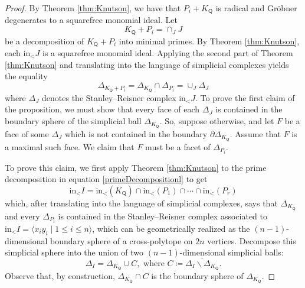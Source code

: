 \documentclass[10pt]{amsart}
\numberwithin{equation}{section}
\theoremstyle{definition}
\theoremstyle{remark}
\newcommand{\1}{^{-1}}
\def\Q{\mathsf{Q}}
\begin{document}
\begin{proof}
By Theorem \ref{thm:Knutson}, we have that $P_i+K_\Q$ is radical and Gr\"obner degenerates to a squarefree monomial ideal. Let 
\[
K_\Q+P_i = \cap_J J
\]
be a decomposition of $K_\Q+P_i$ into minimal primes. By Theorem \ref{thm:Knutson}, each $\textrm{in}_< J$ is a squarefree monomial ideal. Applying the second part of Theorem \ref{thm:Knutson} and translating into the language of simplicial complexes yields the equality
\[
\Delta_{K_\Q+P_i} = \Delta_{K_\Q}\cap \Delta_{P_i} = \cup_J \Delta_J
\]
where  $\Delta_J$ denotes the Stanley--Reisner complex $\textrm{in}_< J$. To prove the first claim of the proposition, we must show that every face of each $\Delta_J$ is contained in the boundary sphere of the simplicial ball $\Delta_{K_\Q}$. 
So, suppose otherwise, and let $F$ be a face of some $\Delta_J$ which is not contained in the boundary $\partial \Delta_{K_\Q}$. Assume that $F$ is a maximal such face. We claim that $F$ must be a facet of $\Delta_{P_i}$.  %

To prove this claim, we first apply Theorem \ref{thm:Knutson} to the prime decomposition in equation \eqref{primeDecompositionl} to get
\begin{equation}\label{eq:simplicialEquality}
\textrm{in}_< I = \textrm{in}_< (K_\Q)\cap \textrm{in}_<(P_1)\cap\cdots \cap \textrm{in}_<(P_r)
\end{equation}
which, after translating into the language of simplicial complexes, says that $\Delta_{K_\Q}$ and every $\Delta_{P_i}$ is contained in the Stanley--Reisner complex associated to $\textrm{in}_< I = \langle x_iy_i \mid 1\leq i\leq n \rangle$, which can be geometrically realized as the $(n-1)$-dimensional boundary sphere of a cross-polytope on $2n$ vertices. Decompose this simplicial sphere into the union of two $(n-1)$-dimensional simplicial balls:
\[
\Delta_I = \Delta_{K_\Q}\cup C, \textrm{  where  } C \coloneqq \overline{\Delta_I\smallsetminus \Delta_{K_\Q}}.
\]
Observe that, by construction, $\Delta_{K_\Q}\cap C$ is the boundary sphere of $\Delta_{K_\Q}$.


\end{proof}
\end{document}

